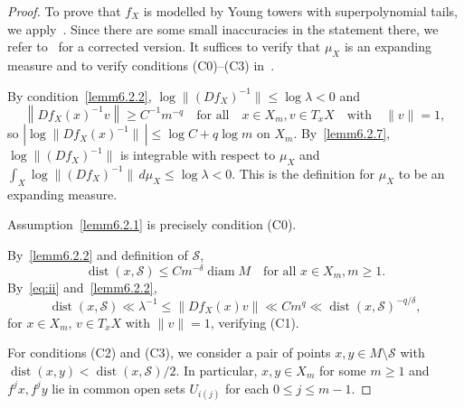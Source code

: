\documentclass[10pt]{amsart}
\theoremstyle{definition}\newtheorem{defi}[theo]{Definition}\newtheorem{rema}[theo]{Remark}\newtheorem{exam}[theo]{Example}\newtheorem{exem}[theo]{Example}\newtheorem{nota}[theo]{Notation}
\newcommand{\cS}{\mathcal{S}}
\DeclareMathOperator{\diam}{diam}
\DeclareMathOperator{\dist}{dist}
\begin{document}
\begin{proof}
To prove that $f_X$ is modelled by Young towers with superpolynomial tails, we apply~\cite[Theorem~C]{AFLV11}. Since there are some small inaccuracies in the statement there, we refer to~\cite[Theorem~A.1]{AraujoMsub} for a corrected version. It suffices to verify that $\mu_X$ is an expanding measure and to verify conditions (C0)--(C3) in~\cite[Appendix~A]{AraujoMsub}.

By condition~\eqref{lemm6.2.2}, $\log \|(Df_X)^{-1}\|\le\log\lambda<0$ and
\begin{equation}\label{eq:iv}
\left\|Df_X(x)^{-1}v\right\|\ge C^{-1}m^{-q}
\quad\text{for all}\quad x\in X_m, v\in T_xX\quad\text{with}\quad\|v\|=1,
\end{equation}
so $|\log \|Df_X(x)^{-1}\|\,|\le \log C+q\log m$ on $X_m$. By~\eqref{lemm6.2.7}, $\log \|(Df_X)^{-1}\|$ is integrable with respect to $\mu_X$ and $\int_X \log \|(Df_X)^{-1}\|\,d\mu_X\le\log\lambda<0$. This is the definition for $\mu_X$ to be an expanding measure.

Assumption~\eqref{lemm6.2.1} is precisely condition (C0).

By~\eqref{lemm6.2.2} and definition of $\cS$,
\begin{equation}\label{eq:ii}
\dist(x,\cS)\le Cm^{-\delta}\diam M
\quad\text{for all }x\in X_m, m\ge1.
\end{equation}
By~\eqref{eq:ii} and~\eqref{lemm6.2.2},
\[
\dist(x,\cS)\ll \lambda^{-1}\le \left\|Df_X(x)v\right\|\ll Cm^q\ll \dist(x,\cS)^{-q/\delta},
\]
for $x\in X_m$, $v\in T_xX$ with $\|v\|=1$, verifying (C1).

For conditions (C2) and (C3), we consider a pair of points $x,y\in M\setminus\cS$ with $\dist(x,y)<\dist(x,\cS)/2$. In particular, $x,y\in X_m$ for some $m\ge1$ and $f^jx,f^jy$ lie in common open sets $U_{i(j)}$ for each $0\le j\le m-1$.


\end{proof}
\end{document}
